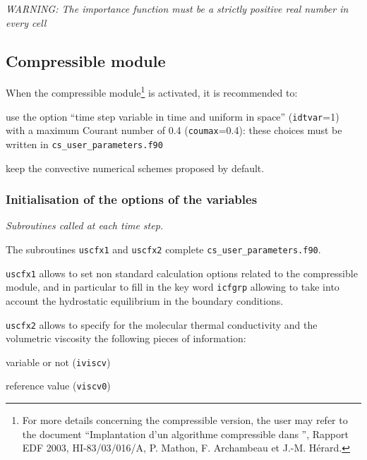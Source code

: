 {{{\noindent
\emph{WARNING: The importance function must be a strictly positive real
number in every cell}

\subsection{Compressible module}

When the compressible module\footnote{For more details concerning the
compressible version, the user may refer to the document ``Implantation
d'un algorithme compressible dans \CS'', Rapport EDF 2003,
HI-83/03/016/A, P. Mathon, F. Archambeau et J.-M. H\'erard.} is
activated, it is recommended to:
\begin{list}{-}{}
 \item use the option ``time step variable in time and uniform in
       space'' (\texttt{idtvar}=1) with a maximum Courant number of 0.4
       (\texttt{coumax}=0.4): these choices must be written in \texttt{cs\_user\_parameters.f90}
 \item keep the convective numerical schemes proposed by default.
\end{list}

\subsubsection{ Initialisation of the options of the variables}
\label{prg_uscfx12}%
\noindent
\textit{Subroutines called at each time step.}

The subroutines \texttt{uscfx1} and \texttt{uscfx2} complete \texttt{cs\_user\_parameters.f90}.

\texttt{uscfx1} allows to set non standard calculation options related to the
compressible module, and in particular to fill in the key word \texttt{icfgrp}
allowing to take into account the hydrostatic equilibrium in the
boundary conditions.

\texttt{uscfx2} allows to specify for the molecular thermal conductivity and
the volumetric viscosity the following pieces of information:
\begin{list}{-}{}
  \item variable or not (\texttt{iviscv})
  \item reference value (\texttt{viscv0})
\end{list}

}}}
